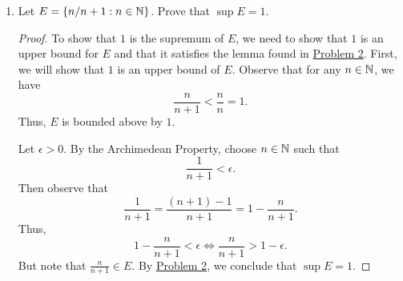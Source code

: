 \documentclass[11pt,a4paper]{article}
\begin{document}
\begin{enumerate}
\begin{proof}
    Suppose \( \gamma < \alpha  \). Thus, we have \( \alpha - \gamma > 0  \), so pick \( \epsilon = \alpha - \gamma  \).  Our goal is to find some element \( x \) in \( E  \) such that \( x > \alpha - \epsilon \). Choose \( \epsilon = \alpha - \gamma  \). By assumption, there exists an element \( {x}_{0} \in E  \) such that     
    \[  {x}_{0} > \alpha - \epsilon = \alpha - (\alpha - \gamma) = \gamma. \]
    Thus, \( {x}_{0} > \gamma  \) for some \( {x}_{0} \in E  \). Therefore, \( \gamma  \) is NOT an upper bound of \( E  \) and so we conclude that 
    \[  \alpha = \sup E. \]
    \end{proof}

\item Let \( E  = \{ n / n + 1 : n \in \mathbb{N}  \}  \). Prove that \( \sup E  = 1  \). 
    \begin{proof}
    To show that \( 1  \) is the supremum of \( E  \), we need to show that \( 1  \) is an upper bound for \( E  \) and that it satisfies the lemma found in {\hyperref[Problem 2]{Problem 2}}. First, we will show that \( 1  \) is an upper bound of \( E  \). Observe that for any \( n \in \mathbb{N}  \), we have  
    \[  \frac{ n  }{  n + 1  }  < \frac{  n }{ n }  = 1.  \]
    Thus, \( E  \) is bounded above by \( 1 \). 

    Let \( \epsilon > 0  \). By the Archimedean Property, choose \( n \in \mathbb{N}  \) such that   
    \[ \frac{ 1 }{ n + 1  } < \epsilon.  \]
    Then observe that 
    \[  \frac{ 1 }{ n + 1  }  = \frac{ (n+1) - 1  }{ n + 1  } = 1 - \frac{ n  }{ n + 1  }.   \]
    Thus, 
    \[  1 - \frac{ n }{ n + 1  } < \epsilon \iff \frac{ n }{ n + 1 }  > 1 - \epsilon. \]
    But note that \( \frac{  n  }{  n+ 1 } \in E   \). By {\hyperref[Problem 2]{Problem 2}}, we conclude that \( \sup E = 1    \). 
    
    

     \end{proof}


\end{enumerate}
\end{document}
